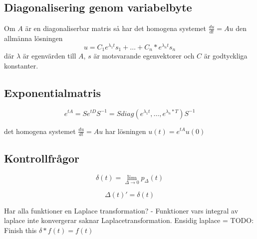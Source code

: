 \documentclass[twocolumn,a4paper]{article}
\begin{document}
\subsection*{Diagonalisering genom variabelbyte}
Om $A$ är en diagonaliserbar matris så har det homogena systemet $\frac{du}{dt} = Au$ den allmänna lösningen
\begin{equation}
    u=C_1e^{\lambda_1t}s_1+\ldots+C_n*e^{\lambda_nt}s_n
\end{equation}
där $\lambda$ är egenvärden till $A$, $s$ är motsvarande egenvektorer och $C$ är godtyckliga konstanter. 
\subsection*{Exponentialmatris}
\begin{equation}
    e^{tA} = Se^{tD}S^{-1} = S diag(e^{\lambda_1t}, \ldots, e^{\lambda_n * T}) S^{-1}
\end{equation}

det homogena systemet $\frac{du}{dt}=Au$ har lösningen $u(t)=e^{tA}u(0)$


\subsection*{Kontrollfrågor}
\begin{equation}
    \delta(t) = \lim_{\Delta \to 0} p_{\Delta}(t)
\end{equation}

\begin{equation}
    \Delta(t)' = \delta(t)
\end{equation}

Har alla funktioner en Laplace transformation? - Funktioner vars integral av laplace inte konvergerar saknar Laplacetransformation.
Ensidig laplace = TODO: Finish this
\newline
\newline
$\delta \ast f(t) = f(t)$
\end{document}
